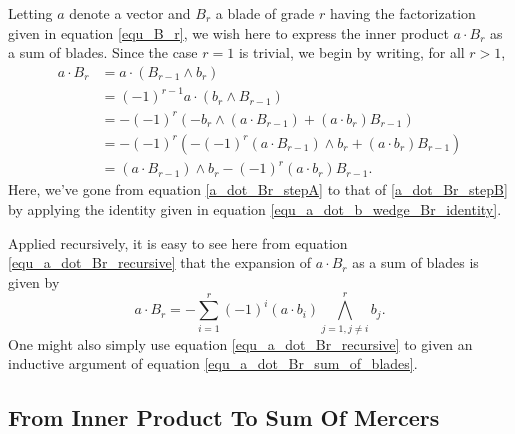 \documentclass{birkjour}
\theoremstyle{definition}
\theoremstyle{remark}
\numberwithin{equation}{section}
\begin{document}
Letting $a$ denote a vector and $B_r$ a blade of grade $r$ having the factorization
given in equation \eqref{equ_B_r}, we wish here to express the inner product $a\cdot B_r$ as a sum of blades.
Since the case $r=1$ is trivial, we begin by writing, for all $r>1$,
\begin{align}
a\cdot B_r
 &= a\cdot(B_{r-1}\wedge b_r)\nonumber \\
 &= (-1)^{r-1}a\cdot(b_r\wedge B_{r-1})\label{a_dot_Br_stepA} \\
 &= -(-1)^r\left(-b_r\wedge(a\cdot B_{r-1})+(a\cdot b_r)B_{r-1}\right)\label{a_dot_Br_stepB} \\
 &= -(-1)^r\left(-(-1)^r(a\cdot B_{r-1})\wedge b_r+(a\cdot b_r)B_{r-1}\right)\nonumber \\
 &= (a\cdot B_{r-1})\wedge b_r - (-1)^r(a\cdot b_r)B_{r-1}.\label{equ_a_dot_Br_recursive}
\end{align}
Here, we've gone from equation \eqref{a_dot_Br_stepA} to that of \eqref{a_dot_Br_stepB} by
applying the identity given in equation \eqref{equ_a_dot_b_wedge_Br_identity}.

Applied recursively, it is easy to see here from equation \eqref{equ_a_dot_Br_recursive} that the expansion of
$a\cdot B_r$ as a sum of blades is given by
\begin{equation}\label{equ_a_dot_Br_sum_of_blades}
a\cdot B_r = -\sum_{i=1}^r(-1)^i(a\cdot b_i)\bigwedge_{j=1,j\neq i}^r b_j.
\end{equation}
One might also simply use equation \eqref{equ_a_dot_Br_recursive} to given an inductive
argument of equation \eqref{equ_a_dot_Br_sum_of_blades}.


\subsection{From Inner Product To Sum Of Mercers}
\end{document}

